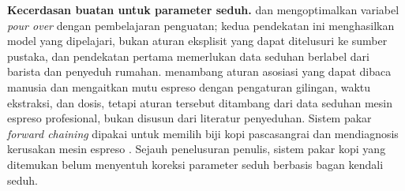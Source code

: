 \textbf{Kecerdasan buatan untuk parameter seduh.} \citet*{bramantoro2025optimization} dan \citet*{jeffery2025optimizing} mengoptimalkan variabel \textit{pour over} dengan pembelajaran penguatan; kedua pendekatan ini menghasilkan model yang dipelajari, bukan aturan eksplisit yang dapat ditelusuri ke sumber pustaka, dan pendekatan pertama memerlukan data seduhan berlabel dari barista dan penyeduh rumahan. \citet*{apiletti2020correlating} menambang aturan asosiasi yang dapat dibaca manusia dan mengaitkan mutu espreso dengan pengaturan gilingan, waktu ekstraksi, dan dosis, tetapi aturan tersebut ditambang dari data seduhan mesin espreso profesional, bukan disusun dari literatur penyeduhan. Sistem pakar \textit{forward chaining} dipakai untuk memilih biji kopi pascasangrai \citep*{anggraeni2024sistem} dan mendiagnosis kerusakan mesin espreso \citep*{rizal2024sistem}. Sejauh penelusuran penulis, sistem pakar kopi yang ditemukan belum menyentuh koreksi parameter seduh berbasis bagan kendali seduh.

